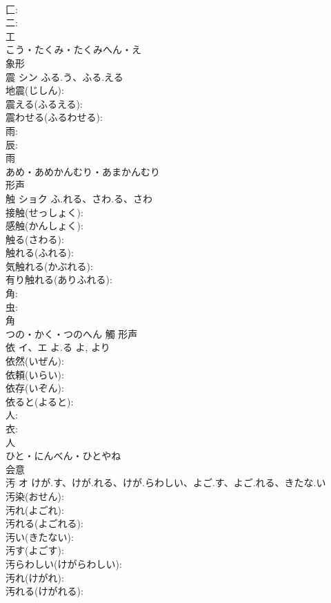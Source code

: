 \documentclass[8pt]{extreport}
\begin{document}
\begin{CJK}{UTF8}{min}
\\	匚: 
\\	二: 
\\	工	
\\	こう・たくみ・たくみへん・え	
\\	象形 
\\	震	シン	ふる.う、ふる.える		
\\	地震(じしん): 
\\	震える(ふるえる): 
\\	震わせる(ふるわせる): 
\\	雨: 
\\	辰: 
\\	雨	
\\	あめ・あめかんむり・あまかんむり	
\\	形声 
\\	触	ショク	ふ.れる、さわ.る、さわ		
\\	接触(せっしょく): 
\\	感触(かんしょく): 
\\	触る(さわる): 
\\	触れる(ふれる): 
\\	気触れる(かぶれる): 
\\	有り触れる(ありふれる): 
\\	角: 
\\	虫: 
\\	角	
\\	つの・かく・つのへん	觸	形声 
\\	依	イ、エ	よ.る	よ, より	
\\	依然(いぜん): 
\\	依頼(いらい): 
\\	依存(いぞん): 
\\	依ると(よると): 
\\	人: 
\\	衣: 
\\	人	
\\	ひと・にんべん・ひとやね	
\\	会意 
\\	汚	オ	けが.す、けが.れる、けが.らわしい、よご.す、よご.れる、きたな.い		
\\	汚染(おせん): 
\\	汚れ(よごれ): 
\\	汚れる(よごれる): 
\\	汚い(きたない): 
\\	汚す(よごす): 
\\	汚らわしい(けがらわしい): 
\\	汚れ(けがれ): 
\\	汚れる(けがれる): 

\end{CJK}
\end{document}
